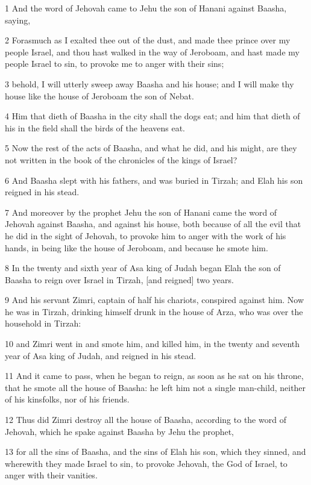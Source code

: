 \par 1 And the word of Jehovah came to Jehu the son of Hanani against Baasha, saying,
\par 2 Forasmuch as I exalted thee out of the dust, and made thee prince over my people Israel, and thou hast walked in the way of Jeroboam, and hast made my people Israel to sin, to provoke me to anger with their sins;
\par 3 behold, I will utterly sweep away Baasha and his house; and I will make thy house like the house of Jeroboam the son of Nebat.
\par 4 Him that dieth of Baasha in the city shall the dogs eat; and him that dieth of his in the field shall the birds of the heavens eat.
\par 5 Now the rest of the acts of Baasha, and what he did, and his might, are they not written in the book of the chronicles of the kings of Israel?
\par 6 And Baasha slept with his fathers, and was buried in Tirzah; and Elah his son reigned in his stead.
\par 7 And moreover by the prophet Jehu the son of Hanani came the word of Jehovah against Baasha, and against his house, both because of all the evil that he did in the sight of Jehovah, to provoke him to anger with the work of his hands, in being like the house of Jeroboam, and because he smote him.
\par 8 In the twenty and sixth year of Asa king of Judah began Elah the son of Baasha to reign over Israel in Tirzah, [and reigned] two years.
\par 9 And his servant Zimri, captain of half his chariots, conspired against him. Now he was in Tirzah, drinking himself drunk in the house of Arza, who was over the household in Tirzah:
\par 10 and Zimri went in and smote him, and killed him, in the twenty and seventh year of Asa king of Judah, and reigned in his stead.
\par 11 And it came to pass, when he began to reign, as soon as he sat on his throne, that he smote all the house of Baasha: he left him not a single man-child, neither of his kinsfolks, nor of his friends.
\par 12 Thus did Zimri destroy all the house of Baasha, according to the word of Jehovah, which he spake against Baasha by Jehu the prophet,
\par 13 for all the sins of Baasha, and the sins of Elah his son, which they sinned, and wherewith they made Israel to sin, to provoke Jehovah, the God of Israel, to anger with their vanities.
